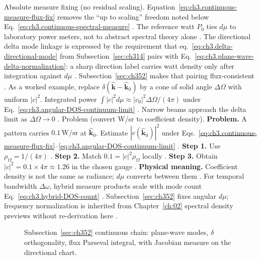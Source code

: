 Absolute measure fixing (no residual scaling). Equation~\eqref{eq:ch3.continuous-measure-flux-fix} removes the ``up to scaling'' freedom noted below
Eq.~\eqref{eq:ch3.continuous-spectral-measure} \cite{stratton1941}. The reference watt \(P_{0}\) ties
\(d\mu\) to laboratory power meters, not to abstract spectral theory alone \cite{poynting1884}.
The directional delta mode linkage is expressed by the requirement that eq.~\eqref{eq:ch3.delta-directional-mode} from Subsection~\ref{sec:ch314} pairs with
Eq.~\eqref{eq:ch3.plane-wave-delta-normalization}: a sharp direction label carries watt density only after integration
against \(d\mu\) \cite{jackson1999}. Subsection~\ref{sec:ch352} makes that pairing flux-consistent
\cite{hansen1988}.
As a worked example, replace \(\delta(\hat{\mathbf{k}}-\hat{\mathbf{k}}_{0})\) by a cone of solid angle \(\Delta\Omega\) with uniform
\(|c|^{2}\). Integrated power \(\int|c|^{2}d\mu\approx |c_{0}|^{2}\Delta\Omega/(4\pi)\) under
Eq.~\eqref{eq:ch3.angular-DOS-continuum-limit} \cite{jackson1999}. Narrow beams approach the delta limit
as \(\Delta\Omega\to0\) \cite{hansen1988}.
Problem (convert W/sr to coefficient density). \textbf{Problem.} A pattern carries \(0.1\,\mathrm{W/sr}\) at \(\hat{\mathbf{k}}_{0}\). Estimate \(|c(\hat{\mathbf{k}}_{0})|^{2}\)
under Eqs.~\eqref{eq:ch3.continuous-measure-flux-fix}--\eqref{eq:ch3.angular-DOS-continuum-limit}
\cite{jackson1999}.
\textbf{Step 1.} Use \(\rho_{\Omega}=1/(4\pi)\) \cite{hansen1988}.
\textbf{Step 2.} Match \(0.1=|c|^{2}\rho_{\Omega}\) locally \cite{jackson1999}.
\textbf{Step 3.} Obtain \(|c|^{2}=0.1\times4\pi\approx1.26\) in the chosen gauge \cite{harrington2001}.
\textbf{Physical meaning.} Coefficient density is not the same as radiance; \(d\mu\) converts between them
\cite{stratton1941}.
For temporal bandwidth \(\Delta\omega\), hybrid measure products scale with mode count
Eq.~\eqref{eq:ch3.hybrid-DOS-count} \cite{jackson1999}. Subsection~\ref{sec:ch352} fixes angular \(d\mu\);
frequency normalization is inherited from Chapter~\ref{ch:02} spectral density previews without re-derivation here
\cite{stratton1941}.
\begin{figure}[t]
\centering
{}
\caption{Subsection~\ref{sec:ch352} continuous chain: plane-wave modes, \(\delta\) orthogonality, flux Parseval integral,
with Jacobian measure on the directional chart.}
\label{fig:ch3.352-plane-wave-chain}
\end{figure}
